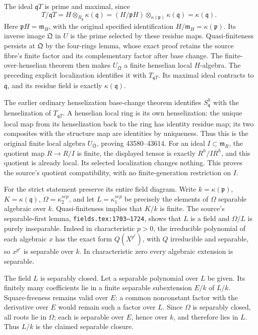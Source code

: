 The ideal \(\mathfrak qT\) is prime and maximal, since \[
 T/\mathfrak qT
 =H\otimes_{R_{\mathfrak p}}\kappa(\mathfrak q)
 =(H/\mathfrak pH)\otimes_{\kappa(\mathfrak p)}\kappa(\mathfrak q)
 =\kappa(\mathfrak q).
\] Here \(\mathfrak pH=\mathfrak m_H\), with the original specified identification \(H/\mathfrak m_H=\kappa(\mathfrak p)\). Its inverse image \(\mathfrak Q\) in \(U\) is the prime selected by these residue maps. Quasi-finiteness persists at \(\mathfrak Q\) by the four-rings lemma, whose exact proof retains the source fibre's finite factor and its complementary factor after base change. The finite-over-henselian theorem then makes \(U_{\mathfrak Q}\) a finite henselian local \(H\)-algebra. The preceding explicit localization identifies it with \(T_{\mathfrak qT}\). Its maximal ideal contracts to \(\mathfrak q\), and its residue field is exactly \(\kappa(\mathfrak q)\).

The earlier ordinary henselization base-change theorem identifies \(S_{\mathfrak q}^h\) with the henselization of \(T_{\mathfrak qT}\). A henselian local ring is its own henselization: the unique local map from its henselization back to the ring has identity residue map; its two composites with the structure map are identities by uniqueness. Thus this is the original finite local algebra \(U_{\mathfrak Q}\), proving 43580--43614. For an ideal \(I\subset\mathfrak m_R\), the quotient map \(R\to R/I\) is finite, the displayed tensor is exactly \(R^h/IR^h\), and this quotient is already local. Its selected localization changes nothing. This proves the source's quotient compatibility, with no finite-generation restriction on \(I\).

For the strict statement preserve its entire field diagram. Write \(k=\kappa(\mathfrak p)\), \(K=\kappa(\mathfrak q)\), \(\Omega=\kappa_2^{sep}\), and let \(L=\kappa_1^{sep}\) be precisely the elements of \(\Omega\) separable algebraic over \(k\). Quasi-finiteness implies that \(K/k\) is finite. The source's separable-first lemma, \texttt{fields.tex:1703–1724}, shows that \(L\) is a field and \(\Omega/L\) is purely inseparable. Indeed in characteristic \(p>0\), the irreducible polynomial of each algebraic \(x\) has the exact form \(Q(X^{p^e})\), with \(Q\) irreducible and separable, so \(x^{p^e}\) is separable over \(k\). In characteristic zero every algebraic extension is separable.

The field \(L\) is separably closed. Let a separable polynomial over \(L\) be given. Its finitely many coefficients lie in a finite separable subextension \(E/k\) of \(L/k\). Square-freeness remains valid over \(E\): a common nonconstant factor with the derivative over \(E\) would remain such a factor over \(L\). Since \(\Omega\) is separably closed, all roots lie in \(\Omega\); each is separable over \(E\), hence over \(k\), and therefore lies in \(L\). Thus \(L/k\) is the claimed separable closure.

